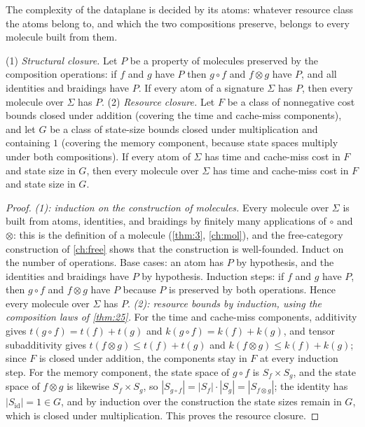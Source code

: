 The complexity of the dataplane is decided by its atoms: whatever resource
class the atoms belong to, and which the two compositions preserve, belongs to
every molecule built from them.

\begin{theorem}\label{thm:30}
 (1) \emph{Structural closure.} Let $P$ be a property of
molecules preserved by the composition operations: if $f$ and $g$ have $P$
then $g \circ f$ and $f \otimes g$ have $P$, and all identities and braidings
have $P$. If every atom of a signature $\Sigma$ has $P$, then every molecule
over $\Sigma$ has $P$.
(2) \emph{Resource closure.} Let $F$ be a class of nonnegative cost bounds
closed under addition (covering the time and cache-miss components), and let
$G$ be a class of state-size bounds closed under multiplication and containing
$1$ (covering the memory component, because state spaces multiply under both
compositions). If every atom of $\Sigma$ has time and cache-miss cost in $F$
and state size in $G$, then every molecule over $\Sigma$ has time and
cache-miss cost in $F$ and state size in $G$.
\end{theorem}

\begin{proof}
\emph{(1): induction on the construction of molecules.} Every molecule over
$\Sigma$ is built from atoms, identities, and braidings by finitely many
applications of $\circ$ and $\otimes$: this is the definition of a molecule
(\autoref{thm:3}, \autoref{ch:mol}), and the free-category construction of
\autoref{ch:free} shows that the construction is well-founded. Induct on the
number of operations. Base cases: an atom has $P$ by hypothesis, and the
identities and braidings have $P$ by hypothesis. Induction steps: if $f$ and
$g$ have $P$, then $g \circ f$ and $f \otimes g$ have $P$ because $P$ is
preserved by both operations. Hence every molecule over $\Sigma$ has $P$.
\emph{(2): resource bounds by induction, using the composition laws of \autoref{thm:25}.}
For the time and cache-miss components, additivity gives
$t (g \circ f) = t (f) + t (g)$ and $k (g \circ f) = k (f) + k (g)$, and tensor
subadditivity gives $t (f \otimes g) \le t (f) + t (g)$ and
$k (f \otimes g) \le k (f) + k (g)$; since $F$ is closed under addition, the
components stay in $F$ at every induction step. For the memory component, the
state space of $g \circ f$ is $S_f \times S_g$, and the state space of
$f \otimes g$ is likewise $S_f \times S_g$, so
$|S_{g \circ f}| = |S_f| \cdot |S_g| = |S_{f \otimes g}|$; the identity has
$|S_{\mathrm{id}}| = 1 \in G$, and by induction over the construction the
state sizes remain in $G$, which is closed under multiplication. This proves
the resource closure.
\end{proof}


